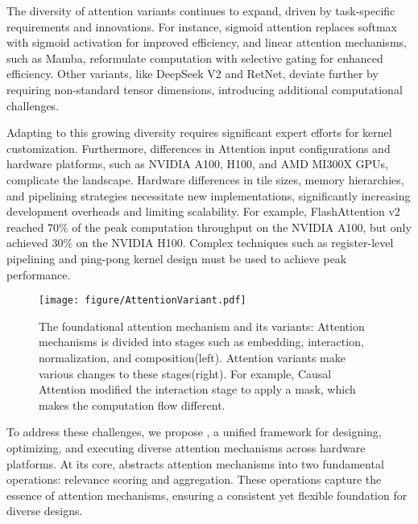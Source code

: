 The diversity of attention variants continues to expand, driven by task-specific requirements and innovations. For instance, sigmoid attention\cite{ramapuram2024sigmoidattn} replaces softmax with sigmoid activation for improved efficiency, and linear attention mechanisms, such as Mamba\cite{dao2024mamba2}, reformulate computation with selective gating for enhanced efficiency. Other variants, like DeepSeek V2\cite{deepseekai2024deepseekv2strongeconomicalefficient} and RetNet\cite{sun2023retentive}, deviate further by requiring non-standard tensor dimensions, introducing additional computational challenges.

Adapting to this growing diversity requires significant expert efforts for kernel customization. Furthermore, differences in Attention input configurations and hardware platforms, such as NVIDIA A100, H100, and AMD MI300X GPUs, complicate the landscape. Hardware differences in tile sizes, memory hierarchies, and pipelining strategies necessitate new implementations, significantly increasing development overheads and limiting scalability. 
For example, FlashAttention v2 reached \(70\%\) of the peak computation throughput on the NVIDIA A100, but only achieved \(30\%\) on the NVIDIA H100. Complex techniques such as register-level pipelining and ping-pong kernel design must be used to achieve peak performance\cite{shah2024flashattention}.

\begin{figure*}[t]
    \centering
    \texttt{[image: figure/AttentionVariant.pdf]}
  \vspace{-2mm}
    \caption{The foundational attention mechanism and its variants: Attention
mechanisms is divided into stages such as embedding, interaction, normalization, and composition(left). Attention variants make various changes to these stages(right). For example, Causal Attention modified the interaction stage to apply a mask, which makes the computation flow different.}
  \vspace{-5mm}
    \label{fig:attention_variant}
\end{figure*}

To address these challenges, we propose \oursys{}, a unified framework for designing, optimizing, and executing diverse attention mechanisms across hardware platforms. At its core, \oursys{} abstracts attention mechanisms into two fundamental operations: relevance scoring and aggregation. These operations capture the essence of attention mechanisms, ensuring a consistent yet flexible foundation for diverse designs.



